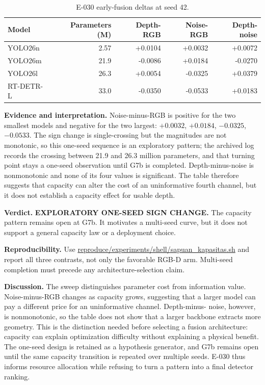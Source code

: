 \documentclass[preprint,12pt]{elsarticle}
\newcommand{\pathcode}[1]{\scriptsize\url{#1}}
\begin{document}
\begin{table}[H]
\centering
\caption{E-030 early-fusion deltas at seed 42.}
\label{tab:e030}
\begin{tabular}{lrrrr}
\toprule
Model & Parameters (M) & Depth-RGB & Noise-RGB & Depth-noise\\
\midrule
YOLO26n & 2.57 & +0.0104 & +0.0032 & +0.0072\\
YOLO26m & 21.9 & -0.0086 & +0.0184 & -0.0270\\
YOLO26l & 26.3 & +0.0054 & -0.0325 & +0.0379\\
RT-DETR-L & 33.0 & -0.0350 & -0.0533 & +0.0183\\
\bottomrule
\end{tabular}
\end{table}

\textbf{Evidence and interpretation.} Noise-minus-RGB is positive for the two
smallest models and negative for the two largest: \(+0.0032\), \(+0.0184\),
\(-0.0325\), \(-0.0533\). The sign change is single-crossing but the
magnitudes are not monotonic, so this one-seed sequence is an exploratory
pattern; the archived log records the crossing between 21.9 and 26.3 million
parameters, and that turning point stays a one-seed observation until G7b is
completed. Depth-minus-noise is nonmonotonic and none of its four values is
significant. The table therefore suggests that capacity can alter the cost of
an uninformative fourth channel, but it does not establish a capacity effect
for usable depth.

\textbf{Verdict.} \textbf{EXPLORATORY ONE-SEED SIGN CHANGE.} The capacity
pattern remains open at G7b. It motivates a multi-seed curve, but it does not
support a general capacity law or a deployment choice.

\textbf{Reproducibility.} Use \pathcode{reproduce/experiments/shell/sapuan_kapasitas.sh} and report
all three contrasts, not only the favorable RGB-D arm. Multi-seed completion
must precede any architecture-selection claim.

\textbf{Discussion.} The sweep distinguishes parameter cost from information
value. Noise-minus-RGB changes as capacity grows, suggesting that a larger
model can pay a different price for an uninformative channel. Depth-minus-
noise, however, is nonmonotonic, so the table does not show that a larger
backbone extracts more geometry. This is the distinction needed before
selecting a fusion architecture: capacity can explain optimization
difficulty without explaining a physical benefit. The one-seed design is
retained as a hypothesis generator, and G7b remains open until the same
capacity transition is repeated over multiple seeds. E-030 thus informs
resource allocation while refusing to turn a pattern into a final detector
ranking.
\end{document}
